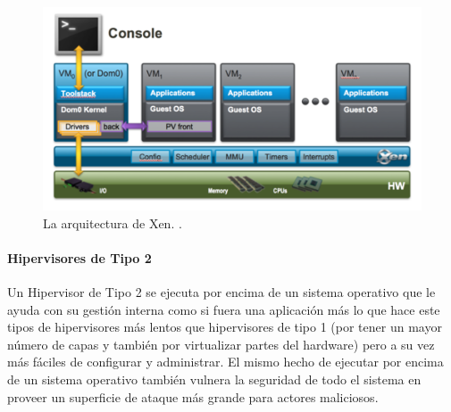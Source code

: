 \begin{figure}
  \begin{center}
      \includegraphics[width=\textwidth]{Figures/arq-xen.png}
  \end{center}
  \caption{La arquitectura de Xen. \citep{Xen-Project-Overview}.}
  \label{arq-xen}
\end{figure}

\paragraph{Hipervisores de Tipo 2}
Un Hipervisor de Tipo 2 se ejecuta por encima de un sistema operativo que le ayuda con su gestión interna como si fuera una aplicación más \citep{IBM-Hypervisors} lo que hace este tipos de hipervisores más lentos que hipervisores de tipo 1 (por tener un mayor número de capas y también por virtualizar partes del hardware) pero a su vez más fáciles de configurar y administrar. El mismo hecho de ejecutar por encima de un sistema operativo también vulnera la seguridad de todo el sistema en proveer un superficie de ataque más grande para actores maliciosos.

